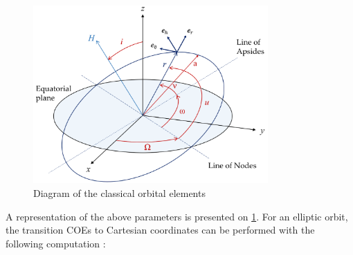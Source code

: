 \begin{figure}
	\centering
	\includegraphics[width=0.8\textwidth]{Figures/orbital_ements}
	\caption{Diagram of the classical orbital elements}
	\label{fig:orbital_elements}
\end{figure}

A representation of the above parameters is presented on \cref{fig:orbital_elements}. For an elliptic orbit, the transition \gls{COEs} to Cartesian coordinates can be performed with the following computation \cite{schaub_analytical_2003}:

